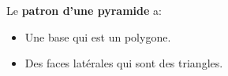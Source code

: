 
Le \textbf{patron d'une pyramide} a:
\begin{itemize}
\item Une base qui est un polygone.
\item Des faces latérales qui sont des triangles.  
\end{itemize}